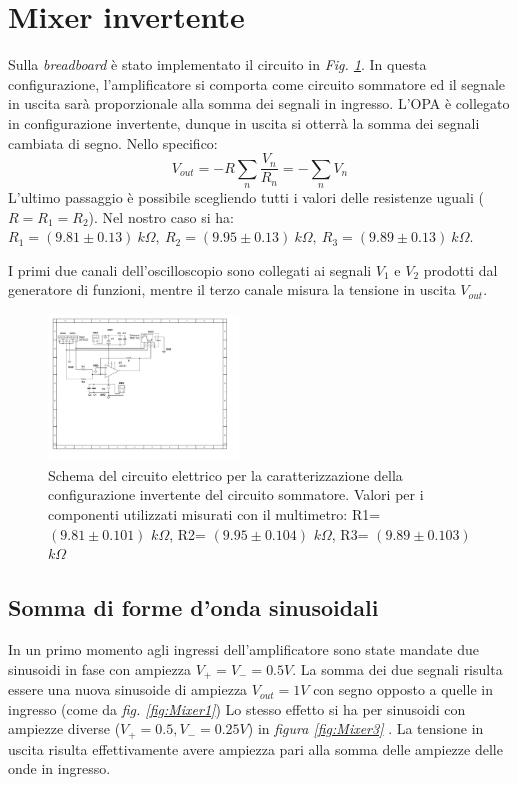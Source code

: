 \documentclass[journal]{IEEEtran}
\begin{document}

\section{\textbf{Mixer invertente}} %
Sulla \textit{breadboard} è stato implementato il circuito in \textit{Fig. \ref{fig:OPA-mixer}}. In questa configurazione, l'amplificatore si comporta come circuito sommatore ed il segnale in uscita sarà proporzionale alla somma dei segnali in ingresso. L'OPA è collegato in configurazione invertente, dunque in uscita si otterrà la somma dei segnali cambiata di segno. Nello specifico: 
\[V_{out} = - R  \sum_{n} \frac{V_n}{R_n} = - \sum_{n} V_n \tag{1} \] L'ultimo passaggio è possibile scegliendo tutti i valori delle resistenze uguali ($R = R_1 = R_2$). Nel nostro caso si ha: $R_1 =(9.81 \pm 0.13) \ k\Omega, \ R_2 = (9.95 \pm 0.13) \ k\Omega ,\ R_3 = (9.89 \pm 0.13) \ k\Omega$.

I primi due canali dell'oscilloscopio sono collegati ai segnali $V_1$ e $V_2$ prodotti dal generatore di funzioni, mentre il terzo canale misura la tensione in uscita $V_{out}$.


\begin{figure}[H]%
\begin {center}
\includegraphics[width=0.45\textwidth]{sch-simulations/output/OPA-mixer.pdf}
\caption{Schema  del  circuito  elettrico  per  la  caratterizzazione  della configurazione invertente del circuito sommatore. Valori per i componenti utilizzati misurati con il multimetro: R1= $(9.81 \pm 0.101)$ $k\Omega$, R2= $(9.95 \pm 0.104)$ $k\Omega$, R3= $(9.89 \pm 0.103)$ $k\Omega$}
\label{fig:OPA-mixer}
\end {center}
\end{figure}

\vspace{-10mm}


\subsection{\textbf{Somma di forme d'onda sinusoidali}}
In un primo momento agli ingressi dell'amplificatore sono state mandate due sinusoidi in fase con ampiezza $V_+ = V_- = 0.5 V$. La somma dei due segnali risulta essere una nuova sinusoide di ampiezza $V_{out} = 1 V$ con segno opposto a quelle in ingresso (come da \textit{fig. \ref{fig:Mixer1}})
Lo stesso effetto si ha per sinusoidi con ampiezze diverse ($V_+ = 0.5, V_- = 0.25 V$) in \textit{figura \ref{fig:Mixer3} }. La tensione in uscita risulta effettivamente avere ampiezza pari alla somma delle ampiezze delle onde in ingresso.
\end{document}
